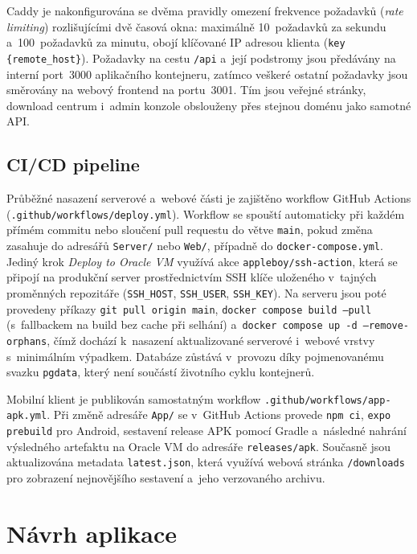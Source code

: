 Caddy je nakonfigurována se dvěma pravidly omezení frekvence požadavků
(\textit{rate limiting}) rozlišujícími dvě časová okna: maximálně
10~požadavků za sekundu a~100~požadavků za minutu, obojí klíčované
IP adresou klienta (\texttt{key \{remote\_host\}}). Požadavky na cestu
\texttt{/api} a~její podstromy jsou předávány na interní port~3000
aplikačního kontejneru, zatímco veškeré ostatní požadavky jsou směrovány
na webový frontend na portu~3001. Tím jsou veřejné stránky, download
centrum i~admin konzole obslouženy přes stejnou doménu jako samotné API.

\subsection{CI/CD pipeline}

{\sloppy
Průběžné nasazení serverové a~webové části je zajištěno workflow GitHub
Actions (\texttt{.github/workflows/deploy.yml}). Workflow se spouští
automaticky při každém přímém commitu nebo sloučení pull requestu do
větve \texttt{main}, pokud změna zasahuje do adresářů \texttt{Server/}
nebo \texttt{Web/}, případně do \texttt{docker-\allowbreak compose.yml}. Jediný krok
\textit{Deploy to Oracle VM} využívá akce
\texttt{appleboy/}\allowbreak\texttt{ssh-action}, která se připojí na produkční server
prostřednictvím SSH klíče uloženého v~tajných proměnných repozitáře
(\texttt{SSH\_HOST}, \allowbreak \texttt{SSH\_USER}, \allowbreak \texttt{SSH\_KEY}).
Na serveru jsou poté provedeny příkazy \texttt{git pull origin main},
\texttt{docker compose build --pull} (s~fallbackem na build bez cache při
selhání) a~\texttt{docker compose up -d --remove-orphans}, čímž dochází
k~nasazení aktualizované serverové i~webové vrstvy s~minimálním výpadkem.
Databáze zůstává v~provozu díky pojmenovanému svazku \texttt{pgdata}, který
není součástí životního cyklu kontejnerů.

Mobilní klient je publikován samostatným workflow
\texttt{.github/workflows/app-\allowbreak apk.yml}. Při změně adresáře
\texttt{App/} se v~GitHub Actions provede \texttt{npm ci},
\texttt{expo prebuild} pro Android, sestavení release APK pomocí
Gradle a~následné nahrání výsledného artefaktu na Oracle VM do adresáře
\texttt{releases/apk}. Současně jsou aktualizována metadata
\texttt{latest.json}, která využívá webová stránka \texttt{/downloads}
pro zobrazení nejnovějšího sestavení a~jeho verzovaného archivu.
}

\section{Návrh aplikace}


